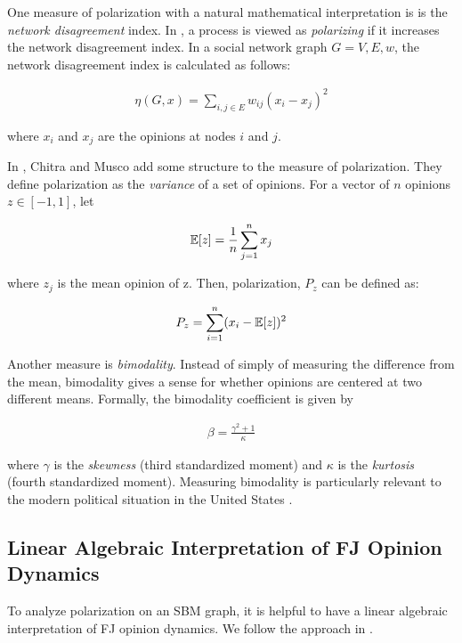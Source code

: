 One measure of polarization with a natural mathematical interpretation is is the \emph{network disagreement} index. In \cite{Dandekarpnas}, a process is viewed as \emph{polarizing} if it increases the network disagreement index. In a social network graph $G = {V,E,w}$, the network disagreement index is calculated as follows:

\begin{align}
    \eta(G,x) = \sum_{i,j \in E} w_{ij}(x_i - x_j)^2 
    \nonumber
\end{align}

where $x_i$ and $x_j$ are the opinions at nodes $i$ and $j$.

In \cite{chitra20analyzing}, Chitra and Musco add some structure to the measure of polarization. They define polarization as the \emph{variance} of a set of opinions. For a vector of $n$ opinions ${z} \in [-1,1]$, let

\begin{align}
    \operatorname*{\mathbb{E}}[{z}] = \frac{1}{n}\sum_{j=1}^n x_j 
    \nonumber
\end{align}

where $z_j$ is the mean opinion of {z}. Then, polarization, $P_z$ can be defined as:

\begin{align}
    P_z = \sum_{i=1}^n (x_i - \operatorname*{\mathbb{E}}[{z}])^2
    \nonumber
\end{align}

Another measure is \emph{bimodality}.
Instead of simply of measuring the difference from the mean,
bimodality gives a sense for whether opinions are centered
at two different means.
Formally, the bimodality coefficient is given by

\begin{align}
    \beta = \frac{\gamma^2 + 1}{\kappa}
    \nonumber
\end{align}

\noindent where $\gamma$ is the \emph{skewness} (third standardized moment) and $\kappa$ is the \emph{kurtosis} (fourth standardized moment). 
Measuring bimodality is particularly relevant to
the modern political situation in the United States
\cite{bromley2017tale}.

\subsection{Linear Algebraic Interpretation of FJ Opinion Dynamics} 
To analyze polarization on an SBM graph, it is helpful to have a linear algebraic interpretation of FJ opinion dynamics. We follow the approach in  \cite{chitra20analyzing}.

